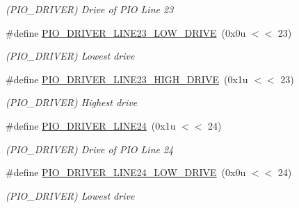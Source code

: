 \begin{DoxyCompactItemize}
\begin{DoxyCompactList}\small\item\em (P\+I\+O\+\_\+\+D\+R\+I\+V\+ER) Drive of P\+IO Line 23 \end{DoxyCompactList}\item 
\mbox{\label{group__SAME70__PIO_ga2b8e47adf8d2fcbdc36cda27be4ea6c1}} 
\#define \mbox{\hyperlink{group__SAME70__PIO_ga2b8e47adf8d2fcbdc36cda27be4ea6c1}{P\+I\+O\+\_\+\+D\+R\+I\+V\+E\+R\+\_\+\+L\+I\+N\+E23\+\_\+\+L\+O\+W\+\_\+\+D\+R\+I\+VE}}~(0x0u $<$$<$ 23)
\begin{DoxyCompactList}\small\item\em (P\+I\+O\+\_\+\+D\+R\+I\+V\+ER) Lowest drive \end{DoxyCompactList}\item 
\mbox{\label{group__SAME70__PIO_ga196410dea1d03933d7c7f824de9f3517}} 
\#define \mbox{\hyperlink{group__SAME70__PIO_ga196410dea1d03933d7c7f824de9f3517}{P\+I\+O\+\_\+\+D\+R\+I\+V\+E\+R\+\_\+\+L\+I\+N\+E23\+\_\+\+H\+I\+G\+H\+\_\+\+D\+R\+I\+VE}}~(0x1u $<$$<$ 23)
\begin{DoxyCompactList}\small\item\em (P\+I\+O\+\_\+\+D\+R\+I\+V\+ER) Highest drive \end{DoxyCompactList}\item 
\mbox{\label{group__SAME70__PIO_ga5afc8b6ebba796c7667dbedf3c78ebfe}} 
\#define \mbox{\hyperlink{group__SAME70__PIO_ga5afc8b6ebba796c7667dbedf3c78ebfe}{P\+I\+O\+\_\+\+D\+R\+I\+V\+E\+R\+\_\+\+L\+I\+N\+E24}}~(0x1u $<$$<$ 24)
\begin{DoxyCompactList}\small\item\em (P\+I\+O\+\_\+\+D\+R\+I\+V\+ER) Drive of P\+IO Line 24 \end{DoxyCompactList}\item 
\mbox{\label{group__SAME70__PIO_ga4928c9718ac79982184ebeb7899f1a6e}} 
\#define \mbox{\hyperlink{group__SAME70__PIO_ga4928c9718ac79982184ebeb7899f1a6e}{P\+I\+O\+\_\+\+D\+R\+I\+V\+E\+R\+\_\+\+L\+I\+N\+E24\+\_\+\+L\+O\+W\+\_\+\+D\+R\+I\+VE}}~(0x0u $<$$<$ 24)
\begin{DoxyCompactList}\small\item\em (P\+I\+O\+\_\+\+D\+R\+I\+V\+ER) Lowest drive \end{DoxyCompactList}\item 

\end{DoxyCompactItemize}
